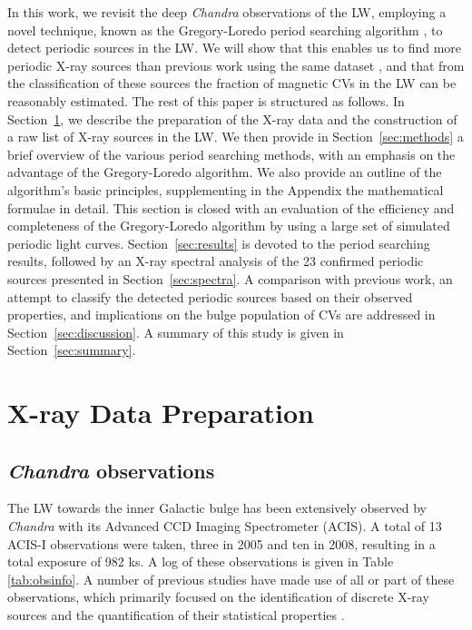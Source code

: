 \documentclass[fleqn,usenatbib]{mnras}
\begin{document}
In this work, we revisit the deep {\it Chandra} observations of the LW, employing a novel technique, known as the Gregory-Loredo period searching algorithm \citep{1992ApJ...398..146G}, to detect periodic sources in the LW. We will show that this enables us to find more periodic X-ray sources than previous work using the same dataset \citep{2012ApJ...746..165H}, and that from the classification of these sources the fraction of magnetic CVs in the LW can be reasonably estimated. 
The rest of this paper is structured as follows.
In Section~\ref{sec:obs}, we describe the preparation of the X-ray data and the construction of a raw list of X-ray sources in the LW.
We then provide in Section~\ref{sec:methods} a brief overview of the various period searching methods, with an emphasis on the advantage of the Gregory-Loredo algorithm. We also provide an outline of the algorithm's basic principles, supplementing in the Appendix the mathematical formulae in detail.
This section is closed with an evaluation of the efficiency and completeness of the Gregory-Loredo algorithm by using a large set of simulated periodic light curves. 
Section~\ref{sec:results} is devoted to the period searching results, followed by an X-ray spectral analysis of the 23 confirmed periodic sources presented in Section~\ref{sec:spectra}.
A comparison with previous work, an attempt to classify the detected periodic sources based on their observed properties, and implications on the bulge population of CVs are addressed in Section~\ref{sec:discussion}.
A summary of this study is given in Section~\ref{sec:summary}.

\section{X-ray Data Preparation} \label{sec:obs}
\subsection{{\it Chandra} observations} \label{subsec:xdata}
The LW towards the inner Galactic bulge has been extensively observed by {\it Chandra} with its Advanced CCD Imaging Spectrometer (ACIS).
A total of 13 ACIS-I observations were taken, three in 2005 and ten in 2008, resulting in a total exposure of 982 ks.
A log of these observations is given in Table \ref{tab:obsinfo}. 
A number of previous studies have made use of all or part of these observations, which primarily focused on the identification of discrete X-ray sources and the quantification of their statistical properties \citep{2009Natur.458.1142R,2009ApJ...700.1702V,2009ApJ...706..223H,2011MNRAS.414..495R,2012MNRAS.427.1633H,2013ApJ...766...14M,2016MNRAS.462L.106W}.
\end{document}

